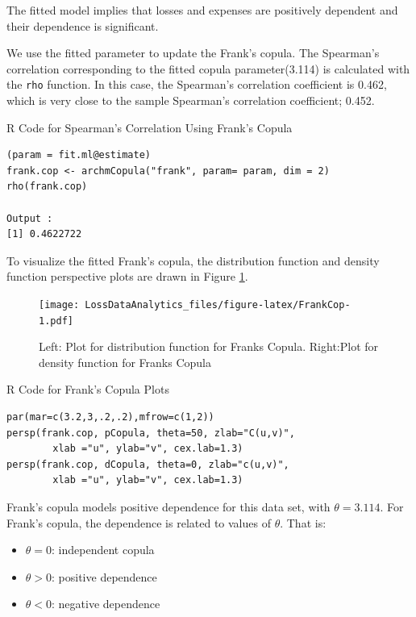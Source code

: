 \documentclass[]{book}
\providecommand{\tightlist}{%
  \setlength{\itemsep}{0pt}\setlength{\parskip}{0pt}}
\theoremstyle{definition}
\theoremstyle{definition}
\theoremstyle{definition}
\theoremstyle{remark}
\begin{document}
The fitted model implies that losses and expenses are positively
dependent and their dependence is significant.

We use the fitted parameter to update the Frank's copula. The Spearman's
correlation corresponding to the fitted copula parameter(3.114) is
calculated with the \texttt{rho} function. In this case, the Spearman's
correlation coefficient is 0.462, which is very close to the sample
Spearman's correlation coefficient; 0.452.

R Code for Spearman's Correlation Using Frank's Copula

\hypertarget{display.fittedCop.2}{}
\begin{verbatim}
(param = fit.ml@estimate)
frank.cop <- archmCopula("frank", param= param, dim = 2)
rho(frank.cop) 

Output : 
[1] 0.4622722
\end{verbatim}

To visualize the fitted Frank's copula, the distribution function and
density function perspective plots are drawn in Figure
\ref{fig:FrankCop}.

\begin{figure}
\centering
\texttt{[image: LossDataAnalytics\_files/figure-latex/FrankCop-1.pdf]}
\caption{\label{fig:FrankCop}Left: Plot for distribution function for Franks
Copula. Right:Plot for density function for Franks Copula}
\end{figure}

R Code for Frank's Copula Plots

\hypertarget{display.DistriPlot.2}{}
\begin{verbatim}
par(mar=c(3.2,3,.2,.2),mfrow=c(1,2))
persp(frank.cop, pCopula, theta=50, zlab="C(u,v)",
        xlab ="u", ylab="v", cex.lab=1.3)
persp(frank.cop, dCopula, theta=0, zlab="c(u,v)",
        xlab ="u", ylab="v", cex.lab=1.3)
\end{verbatim}

Frank's copula models positive dependence for this data set, with
\(\theta=3.114\). For Frank's copula, the dependence is related to
values of \(\theta\). That is:

\begin{itemize}
\tightlist
\item
  \(\theta=0\): independent copula
\item
  \(\theta>0\): positive dependence
\item
  \(\theta<0\): negative dependence
\end{itemize}
\end{document}

